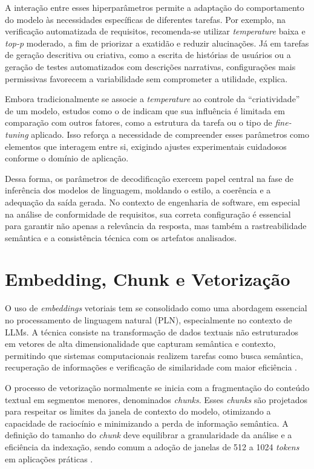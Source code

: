 A interação entre esses hiperparâmetros permite a adaptação do comportamento do modelo às necessidades específicas de diferentes tarefas. Por exemplo, na verificação automatizada de requisitos, recomenda-se utilizar \textit{temperature} baixa e \textit{top-p} moderado, a fim de priorizar a exatidão e reduzir alucinações. Já em tarefas de geração descritiva ou criativa, como a escrita de histórias de usuários ou a geração de testes automatizados com descrições narrativas, configurações mais permissivas favorecem a variabilidade sem comprometer a utilidade, explica.

Embora tradicionalmente se associe a \textit{temperature} ao controle da “criatividade” de um modelo, estudos como o de  indicam que sua influência é limitada em comparação com outros fatores, como a estrutura da tarefa ou o tipo de \textit{fine-tuning} aplicado. Isso reforça a necessidade de compreender esses parâmetros como elementos que interagem entre si, exigindo ajustes experimentais cuidadosos conforme o domínio de aplicação.

Dessa forma, os parâmetros de decodificação exercem papel central na fase de inferência dos modelos de linguagem, moldando o estilo, a coerência e a adequação da saída gerada. No contexto de engenharia de software, em especial na análise de conformidade de requisitos, sua correta configuração é essencial para garantir não apenas a relevância da resposta, mas também a rastreabilidade semântica e a consistência técnica com os artefatos analisados.

\section{Embedding, Chunk e Vetorização}

O uso de \textit{embeddings} vetoriais tem se consolidado como uma abordagem essencial no processamento de linguagem natural (PLN), especialmente no contexto de LLMs. A técnica consiste na transformação de dados textuais não estruturados em vetores de alta dimensionalidade que capturam semântica e contexto, permitindo que sistemas computacionais realizem tarefas como busca semântica, recuperação de informações e verificação de similaridade com maior eficiência .

O processo de vetorização normalmente se inicia com a fragmentação do conteúdo textual em segmentos menores, denominados \textit{chunks}. Esses \textit{chunks} são projetados para respeitar os limites da janela de contexto do modelo, otimizando a capacidade de raciocínio e minimizando a perda de informação semântica. A definição do tamanho do \textit{chunk} deve equilibrar a granularidade da análise e a eficiência da indexação, sendo comum a adoção de janelas de 512 a 1024 \textit{tokens} em aplicações práticas .

